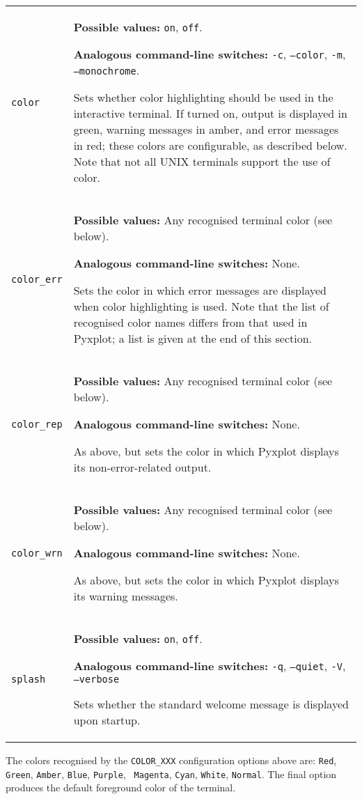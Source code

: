 \begin{longtable}{p{3.4cm}p{9cm}}
{\tt color} & {\bf Possible values:} {\tt on}, {\tt off}.

               {\bf Analogous command-line switches:} {\tt -c}, {\tt --color}, {\tt -m}, {\tt --monochrome}.

               Sets whether color highlighting should be used in the interactive terminal. If turned on, output is displayed in green, warning messages in amber, and error messages in red; these colors are configurable, as described below. Note that not all UNIX terminals support the use of color.
               \\
{\tt color\_err} & {\bf Possible values:} Any recognised terminal color (see below).

               {\bf Analogous command-line switches:} None.

               Sets the color in which error messages are displayed when color highlighting is used. Note that the list of recognised color names differs from that used in Pyxplot; a list is given at the end of this section.
               \\
{\tt color\_rep} & {\bf Possible values:} Any recognised terminal color (see below).

               {\bf Analogous command-line switches:} None.

               As above, but sets the color in which Pyxplot displays its non-error-related output.
               \\
{\tt color\_wrn} & {\bf Possible values:} Any recognised terminal color (see below).

               {\bf Analogous command-line switches:} None.

               As above, but sets the color in which Pyxplot displays its warning messages.
               \\
{\tt splash} & {\bf Possible values:} {\tt on}, {\tt off}.

               {\bf Analogous command-line switches:} {\tt -q}, {\tt --quiet}, {\tt -V}, {\tt --verbose}

               Sets whether the standard welcome message is displayed upon startup.
               \\
\end{longtable}

The colors recognised by the {\tt COLOR\_XXX} configuration options above
are: {\tt Red}, {\tt Green}, {\tt Amber}, {\tt Blue}, {\tt Purple}, {\tt
Magenta}, {\tt Cyan}, {\tt White}, {\tt Normal}. The final option produces the
default foreground color of the terminal.

